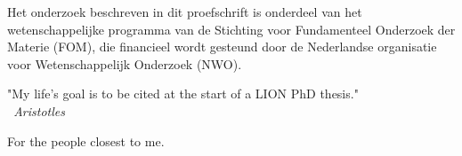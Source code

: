\noindent Het onderzoek beschreven in dit proefschrift is onderdeel van het wetenschappelijke programma van de
Stichting voor Fundamenteel Onderzoek der Materie (FOM), die financieel wordt gesteund door de Nederlandse organisatie voor Wetenschappelijk Onderzoek (NWO).

\clearpage
\noindent
"My life's goal is to be cited at the start of a LION PhD thesis."\\
{\it ~Aristotles}


\vfill
\begin{flushright}
For the people closest to me.
\end{flushright}
\cleardoublepage